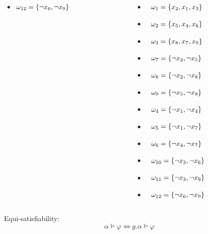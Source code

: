 \documentclass{beamer}
\begin{document}
\begin{frame}
\begin{columns}[t]
\begin{column}[T]{.3\textwidth}
\begin{itemize}
		\item[] $\omega_{12} = \{\neg x_6  ,  \neg x_9\} \tikz[baseline]{\node[anchor=base] (a12){};}$
		\end{itemize}
		\end{column}
		\begin{column}[T]{.3\textwidth}
		\tiny
		\begin{itemize} 
		\item[] $\tikz[baseline]{\node[anchor=base] (b1){};} \omega_{1} = \{x_2  ,  x_1  ,  x_3\}$
		\item[] $\tikz[baseline]{\node[anchor=base] (b2){};} \omega_{2} = \{x_5  ,  x_4  ,  x_6\} $
		\item[] $\tikz[baseline]{\node[anchor=base] (b3){};} \omega_{3} = \{x_8  ,  x_7  ,  x_9\} $
		\item[] $\tikz[baseline]{\node[anchor=base] (b4){};} \omega_{7} = \{\neg x_2  ,  \neg x_5\} $
		\item[] $\tikz[baseline]{\node[anchor=base] (b5){};} \omega_{8} = \{\neg x_2  ,  \neg x_8\} $
		\item[] $\tikz[baseline]{\node[anchor=base] (b6){};} \omega_{9} = \{\neg x_5  ,  \neg x_8\} $
		\item[] $\tikz[baseline]{\node[anchor=base] (b7){};} \omega_{4} = \{\neg x_1  ,  \neg x_4\} $
		\item[] $\tikz[baseline]{\node[anchor=base] (b8){};} \omega_{5} = \{\neg x_1  ,  \neg x_7\} $
		\item[] $\tikz[baseline]{\node[anchor=base] (b9){};} \omega_{6} = \{\neg x_4  ,  \neg x_7\} $
		\item[] $\tikz[baseline]{\node[anchor=base] (b10){};} \omega_{10} = \{\neg x_3  ,  \neg x_6\} $
		\item[] $\tikz[baseline]{\node[anchor=base] (b11){};} \omega_{11} = \{\neg x_3  ,  \neg x_9\} $
		\item[] $\tikz[baseline]{\node[anchor=base] (b12){};} \omega_{12} = \{\neg x_6  ,  \neg x_9\} $
	\end{itemize}
	\end{column}
\end{columns}

\vfill
\normalsize
	Equi-satisfiability:
	$$\alpha \models \varphi \Leftrightarrow g.\alpha \models \varphi$$
	
\end{frame}
\end{document}
